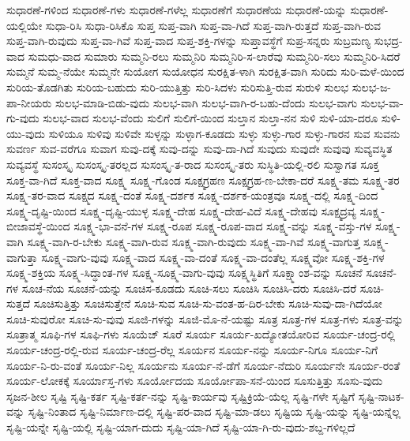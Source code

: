 {ಸುಧಾರಣೆ-ಗಳಿಂದ
ಸುಧಾರಣೆ-ಗಳು
ಸುಧಾರಣೆ-ಗಳೆಲ್ಲ
ಸುಧಾರಣೆಗೆ
ಸುಧಾರಣೆಯ
ಸುಧಾರಣೆ-ಯನ್ನು
ಸುಧಾರಣೆ-ಯಲ್ಲಿಯೇ
ಸುಧಾ-ರಿಸಿ
ಸುಧಾ-ರಿಸಿಕೊ
ಸುಪ್ತ
ಸುಪ್ತ-ವಾಗಿ
ಸುಪ್ತ-ವಾ-ಗಿದೆ
ಸುಪ್ತ-ವಾಗಿ-ರುತ್ತದೆ
ಸುಪ್ತ-ವಾಗಿ-ರುವ
ಸುಪ್ತ-ವಾಗಿ-ರುವುದು
ಸುಪ್ತ-ವಾ-ಗಿವೆ
ಸುಪ್ತ-ವಾದ
ಸುಪ್ತ-ಶಕ್ತಿ-ಗಳನ್ನು
ಸುಪ್ತಾವಸ್ಥೆಗೆ
ಸುಪ್ರ-ಸನ್ನರು
ಸುಬ್ರಮಣ್ಯ
ಸುಭದ್ರ-ವಾದ
ಸುಮಧು-ವಾದ
ಸುಮಾರು
ಸುಮ್ಮನಿ-ರಲು
ಸುಮ್ಮನಿರಿ
ಸುಮ್ಮನಿರಿ-ಸ-ಲಾರೆವು
ಸುಮ್ಮನಿರಿ-ಸಲು
ಸುಮ್ಮನಿರಿ-ಸಿದರೆ
ಸುಮ್ಮನೆ
ಸುಮ್ಮ-ನೆಯೇ
ಸುಮ್ಮನೇ
ಸುಯೋಗ
ಸುಯೋಧನ
ಸುರಕ್ಷಿತ-ಳಾಗಿ
ಸುರಕ್ಷಿತ-ವಾಗಿ
ಸುರಿದು
ಸುರಿ-ಮಳೆ-ಯಿಂದ
ಸುರಿಯ-ತೊಡಗಿತು
ಸುರಿಯ-ಬಹುದು
ಸುರಿ-ಯುತ್ತಿತ್ತು
ಸುರಿ-ಸಿದಳು
ಸುರಿಸುತ್ತಿ-ರುವ
ಸುರುಳಿ
ಸುಲಭ
ಸುಲಭ-ಜ-ಪಾ-ನೀಯರು
ಸುಲಭ-ಮಾಡಿ-ಬಿಡು-ವುದು
ಸುಲಭ-ವಾಗಿ
ಸುಲಭ-ವಾಗಿ-ರ-ಬಹು-ದೆಂದು
ಸುಲಭ-ವಾಗು
ಸುಲಭ-ವಾ-ಗು-ವುದು
ಸುಲಭ-ವಾದ
ಸುಲಭ-ವೆಂದು
ಸುಲಿಗೆ
ಸುಲಿಗೆ-ಯಿಂದ
ಸುಲ್ತಾನ
ಸುಲ್ತಾ-ನನ
ಸುಳಿ
ಸುಳಿ-ಯಾ-ದರೂ
ಸುಳಿ-ಯು-ವುದು
ಸುಳಿಯೂ
ಸುಳಿವು
ಸುಳಿವೇ
ಸುಳ್ಳನ್ನು
ಸುಳ್ಳಾಗ-ಕೂಡದು
ಸುಳ್ಳು
ಸುಳ್ಳು-ಗಾರ
ಸುಳ್ಳು-ಗಾರನ
ಸುವ
ಸುವನು
ಸುವರ್ಣ
ಸುವ-ವರೆಗೂ
ಸುವಾಗ
ಸುವು-ದಕ್ಕೆ
ಸುವು-ದನ್ನು
ಸುವು-ದಾ-ಗಿದೆ
ಸುವುದು
ಸುವುದೇ
ಸುವುವು
ಸುವ್ಯವಸ್ಥಿತ
ಸುವ್ಯವಸ್ಥೆ
ಸುಸಂಸ್ಕೃ
ಸುಸಂಸ್ಕೃ-ತರಲ್ಲದ
ಸುಸಂಸ್ಕೃ-ತ-ರಾದ
ಸುಸಂಸ್ಕೃ-ತರು
ಸುಸ್ಥಿತಿ-ಯಲ್ಲಿ-ರಲಿ
ಸುಸ್ವಾಗತ
ಸೂಕ್ತ
ಸೂಕ್ತ-ವಾ-ಗಿದೆ
ಸೂಕ್ತ-ವಾದ
ಸೂಕ್ಷ್ಮ
ಸೂಕ್ಷ್ಮ-ಗೊಂಡ
ಸೂಕ್ಷ್ಮಗ್ರಹಣ
ಸೂಕ್ಷ್ಮಗ್ರಹ-ಣ-ಬೇಕಾ-ದರೆ
ಸೂಕ್ಷ್ಮ-ತಮ
ಸೂಕ್ಷ್ಮ-ತರ
ಸೂಕ್ಷ್ಮ-ತರ-ವಾದ
ಸೂಕ್ಷ್ಮದ
ಸೂಕ್ಷ್ಮ-ದಂತೆ
ಸೂಕ್ಷ್ಮ-ದರ್ಶಕ
ಸೂಕ್ಷ್ಮ-ದರ್ಶಕ-ಯಂತ್ರವೂ
ಸೂಕ್ಷ್ಮ-ದಲ್ಲಿ
ಸೂಕ್ಷ್ಮ-ದಿಂದ
ಸೂಕ್ಷ್ಮ-ದೃಷ್ಟಿ-ಯಿಂದ
ಸೂಕ್ಷ್ಮ-ದೃಷ್ಟಿ-ಯುಳ್ಳ
ಸೂಕ್ಷ್ಮ-ದೇಹ
ಸೂಕ್ಷ್ಮ-ದೇಹ-ವಿದೆ
ಸೂಕ್ಷ್ಮ-ದೇಹವು
ಸೂಕ್ಷ್ಮದ್ರವ್ಯ
ಸೂಕ್ಷ್ಮ-ಬೀಜಾವಸ್ಥೆ-ಯಿಂದ
ಸೂಕ್ಷ್ಮ-ಭಾ-ವನೆ-ಗಳ
ಸೂಕ್ಷ್ಮ-ರೂಪ
ಸೂಕ್ಷ್ಮ-ರೂಪ-ವಾದ
ಸೂಕ್ಷ್ಮ-ವನ್ನು
ಸೂಕ್ಷ್ಮ-ವಸ್ತು-ಗಳ
ಸೂಕ್ಷ್ಮ-ವಾಗಿ
ಸೂಕ್ಷ್ಮ-ವಾಗಿ-ರ-ಬೇಕು
ಸೂಕ್ಷ್ಮ-ವಾಗಿ-ರುವ
ಸೂಕ್ಷ್ಮ-ವಾಗಿ-ರುವುದು
ಸೂಕ್ಷ್ಮ-ವಾ-ಗಿವೆ
ಸೂಕ್ಷ್ಮ-ವಾಗುತ್ತ
ಸೂಕ್ಷ್ಮ-ವಾಗುತ್ತಾ
ಸೂಕ್ಷ್ಮ-ವಾಗು-ವುವು
ಸೂಕ್ಷ್ಮ-ವಾದ
ಸೂಕ್ಷ್ಮ-ವಾ-ದಂತೆ
ಸೂಕ್ಷ್ಮ-ವಾ-ದಂತೆಲ್ಲ
ಸೂಕ್ಷ್ಮವೋ
ಸೂಕ್ಷ್ಮ-ಶಕ್ತಿ-ಗಳ
ಸೂಕ್ಷ್ಮ-ಶಕ್ತಿಯ
ಸೂಕ್ಷ್ಮ-ಸಿದ್ಧಾಂತ-ಗಳ
ಸೂಕ್ಷ್ಮ-ಸೂಕ್ಷ್ಮ-ವಾಗು-ವುವು
ಸೂಕ್ಷ್ಮಸ್ಥಿತಿಗೆ
ಸೂಕ್ಷ್ಮಾಂಶ-ವನ್ನು
ಸೂಚನೆ
ಸೂಚನೆ-ಗಳ
ಸೂಚ-ನೆಯ
ಸೂಚನೆ-ಯನ್ನು
ಸೂಚಿಸ-ಕೂಡದು
ಸೂಚಿ-ಸಲು
ಸೂಚಿಸಿ
ಸೂಚಿಸಿ-ದರು
ಸೂಚಿಸಿ-ದರೆ
ಸೂಚಿ-ಸುತ್ತದೆ
ಸೂಚಿಸುತ್ತಿತ್ತು
ಸೂಚಿಸುತ್ತೇನೆ
ಸೂಚಿ-ಸುವ
ಸೂಚಿ-ಸು-ವಂತ-ಹ-ದಿರ-ಬೇಕು
ಸೂಚಿ-ಸುವು-ದಾ-ಗಿದೆಯೋ
ಸೂಚಿ-ಸುವುರೋ
ಸೂಚಿ-ಸು-ವುವು
ಸೂಜಿ-ಗಳನ್ನು
ಸೂಜಿ-ಮೊ-ನೆ-ಯಷ್ಟು
ಸೂತ್ರ
ಸೂತ್ರ-ಗಳ
ಸೂತ್ರ-ಗಳು
ಸೂತ್ರ-ವನ್ನು
ಸೂತ್ರಾತ್ಮ
ಸೂಫಿ-ಗಳ
ಸೂಫಿ-ಗಳು
ಸೂಯೆಜ್
ಸೂರೆ
ಸೂರ್ಯ
ಸೂರ್ಯ-ಖದ್ಯೋತಯೋರಿವ
ಸೂರ್ಯ-ಚಂದ್ರ-ರಲ್ಲಿ
ಸೂರ್ಯ-ಚಂದ್ರ-ರಲ್ಲಿ-ರುವ
ಸೂರ್ಯ-ಚಂದ್ರ-ರೆಲ್ಲ
ಸೂರ್ಯನ
ಸೂರ್ಯ-ನನ್ನು
ಸೂರ್ಯ-ನಿಗೂ
ಸೂರ್ಯ-ನಿಗೆ
ಸೂರ್ಯ-ನಿ-ರು-ವಂತೆ
ಸೂರ್ಯ-ನಿಲ್ಲ
ಸೂರ್ಯನು
ಸೂರ್ಯ-ನೆ-ಡೆಗೆ
ಸೂರ್ಯ-ನೆದುರಿ
ಸೂರ್ಯನೇ
ಸೂರ್ಯ-ರಂತೆ
ಸೂರ್ಯ-ಲೋಕಕ್ಕೆ
ಸೂರ್ಯಾಸ್ತ-ಗಳು
ಸೂರ್ಯೋದಯ
ಸೂರ್ಯೋಪಾ-ಸನೆ-ಯಿಂದ
ಸೂಸುತ್ತಿತ್ತು
ಸೂಸು-ವುದು
ಸೃಜನ-ಶೀಲ
ಸೃಷ್ಟಿ
ಸೃಷ್ಟಿ-ಕರ್ತ
ಸೃಷ್ಟಿ-ಕರ್ತ-ನನ್ನು
ಸೃಷ್ಟಿ-ಕಾರ್ಯವು
ಸೃಷ್ಟಿಕ್ರಿಯೆ-ಯೆಲ್ಲ
ಸೃಷ್ಟಿ-ಗಳೇ
ಸೃಷ್ಟಿಗೆ
ಸೃಷ್ಟಿ-ನಾಟಕ-ವನ್ನು
ಸೃಷ್ಟಿ-ನಿಂತಾದ
ಸೃಷ್ಟಿ-ನಿರ್ಮಾಣ-ದಲ್ಲಿ
ಸೃಷ್ಟಿ-ಪರ-ವಾದ
ಸೃಷ್ಟಿ-ಮಾ-ಡಲು
ಸೃಷ್ಟಿಯ
ಸೃಷ್ಟಿ-ಯನ್ನು
ಸೃಷ್ಟಿ-ಯನ್ನೆಲ್ಲ
ಸೃಷ್ಟಿ-ಯನ್ನೇ
ಸೃಷ್ಟಿ-ಯಲ್ಲಿ
ಸೃಷ್ಟಿ-ಯಾಗ-ದುದು
ಸೃಷ್ಟಿ-ಯಾ-ಗಿದೆ
ಸೃಷ್ಟಿ-ಯಾ-ಗಿ-ರು-ವುದು-ಶಬ್ದ-ಗಳಿಲ್ಲದೆ
}

